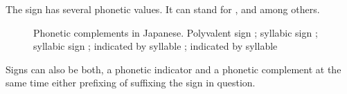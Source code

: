 \documentclass[../main.tex]{subfiles}
\begin{document}
The sign  has several phonetic values.
It can stand for ,  and  among others.
\begin{figure}[ht!]
    \centering
    \caption[Japanese phonetic complements]{Phonetic complements in Japanese.
             Polyvalent sign ;
             syllabic sign ; 
             syllabic sign ;
              indicated by syllable ; 
             indicated by syllable }
\end{figure}
Signs can also be both, a phonetic indicator and a phonetic complement at the same time either
prefixing of suffixing the sign in question.
\end{document}
